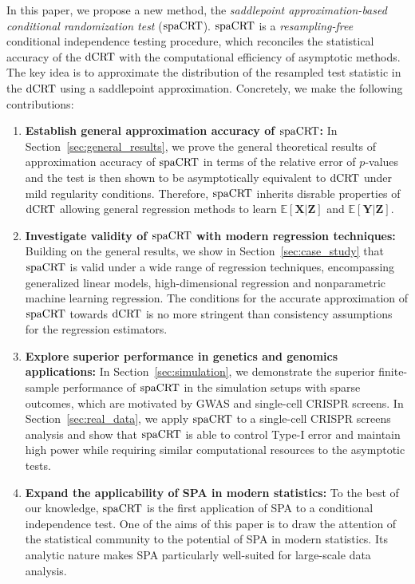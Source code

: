 \documentclass[12pt]{article}
\theoremstyle{definition}
\newcommand{\E}{\mathbb E}								%
\newcommand{\prx}{\bm X}								%
\newcommand{\prz}{\bm Z}								%
\newcommand{\pry}{{\bm Y}}								%
\newcommand{\dCRT}{\textnormal{dCRT}} 					%
\newcommand{\spacrt}{\textnormal{spaCRT}}               %
\begin{document}
In this paper, we propose a new method, the \textit{saddlepoint approximation-based conditional randomization test} ($\spacrt$). $\spacrt$ is a \textit{resampling-free} conditional independence testing procedure, which reconciles the statistical accuracy of the $\dCRT$ with the computational efficiency of asymptotic methods. The key idea is to approximate the distribution of the resampled test statistic in the $\dCRT$ using a saddlepoint approximation. Concretely, we make the following contributions:
\begin{enumerate}
  \item \textbf{Establish general approximation accuracy of $\spacrt$:}
  In Section~\ref{sec:general_results}, we prove the general theoretical results of approximation accuracy of $\spacrt$ in terms of the relative error of $p$-values and the test is then shown to be asymptotically equivalent to $\dCRT$ under mild regularity conditions. Therefore, $\spacrt$ inherits disrable properties of $\dCRT$ allowing general regression methods to learn $\E[\prx|\prz]$ and $\E[\pry|\prz]$.
  \item \textbf{Investigate validity of $\spacrt$ with modern regression techniques:} 
  Building on the general results, we show in Section~\ref{sec:case_study} that $\spacrt$ is valid under a wide range of regression techniques, encompassing generalized linear models, high-dimensional regression and nonparametric machine learning regression. The conditions for the accurate approximation of $\spacrt$ towards $\dCRT$ is no more stringent than consistency assumptions for the regression estimators.
  \item \textbf{Explore superior performance in genetics and genomics applications:} In Section~\ref{sec:simulation}, we demonstrate the superior finite-sample performance of $\spacrt$ in the simulation setups with sparse outcomes, which are motivated by GWAS and single-cell CRISPR screens. In Section~\ref{sec:real_data}, we apply $\spacrt$ to a single-cell CRISPR screens analysis \citep{Gasperini2019a} and show that $\spacrt$ is able to control Type-I error and maintain high power while requiring similar computational resources to the asymptotic tests.
  \item \textbf{Expand the applicability of SPA in modern statistics:} To the best of our knowledge, $\spacrt$ is the first application of SPA to a conditional independence test. One of the aims of this paper is to draw the attention of the statistical community to the potential of SPA in modern statistics. Its analytic nature makes SPA particularly well-suited for large-scale data analysis.
\end{enumerate} 
\end{document}
